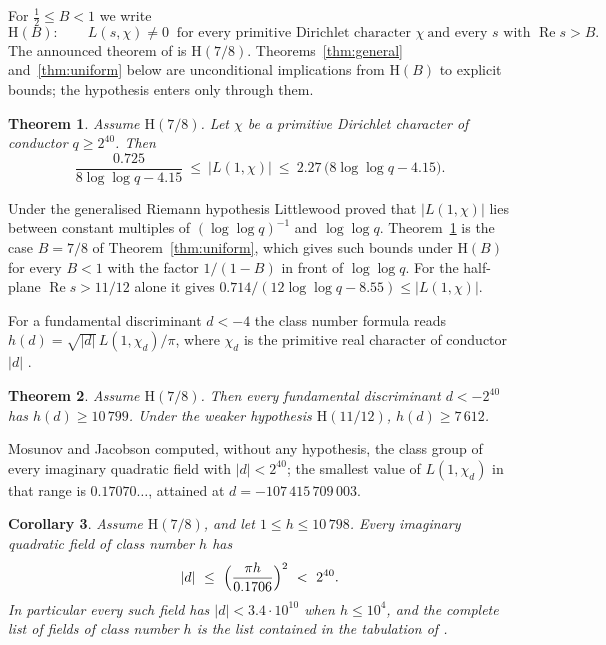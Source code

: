 \documentclass[11pt]{amsart}
\newtheorem{theorem}{Theorem}[section]
\newtheorem{corollary}[theorem]{Corollary}
\theoremstyle{definition}
\theoremstyle{remark}
\renewcommand{\Re}{\operatorname{Re}}
\begin{document}
For $\tfrac12\le B<1$ we write
\[
\mathrm{H}(B):\qquad L(s,\chi)\neq0 \ \text{ for every primitive Dirichlet character }\chi\ \text{and every }s \text{ with } \Re s>B .
\]
The announced theorem of \cite{OAI-QRH} is $\mathrm{H}(7/8)$. Theorems~\ref{thm:general} and~\ref{thm:uniform} below are unconditional implications from $\mathrm{H}(B)$ to explicit bounds; the hypothesis enters only through them.

\begin{theorem}\label{thm:main}
Assume $\mathrm{H}(7/8)$. Let $\chi$ be a primitive Dirichlet character of conductor $q\ge 2^{40}$. Then
\[
\frac{0.725}{8\log\log q-4.15}\ \le\ |L(1,\chi)|\ \le\ 2.27\,\bigl(8\log\log q-4.15\bigr).
\]
\end{theorem}

Under the generalised Riemann hypothesis Littlewood \cite{Lit28} proved that $|L(1,\chi)|$ lies between constant multiples of $(\log\log q)^{-1}$ and $\log\log q$. Theorem~\ref{thm:main} is the case $B=7/8$ of Theorem~\ref{thm:uniform}, which gives such bounds under $\mathrm{H}(B)$ for every $B<1$ with the factor $1/(1-B)$ in front of $\log\log q$. For the half-plane $\Re s>11/12$ alone it gives $0.714/(12\log\log q-8.55)\le|L(1,\chi)|$.

For a fundamental discriminant $d<-4$ the class number formula reads $h(d)=\sqrt{|d|}\,L(1,\chi_d)/\pi$, where $\chi_d$ is the primitive real character of conductor $|d|$ \cite[Chapter 6]{Dav80}.

\begin{theorem}\label{thm:h}
Assume $\mathrm{H}(7/8)$. Then every fundamental discriminant $d<-2^{40}$ has $h(d)\ge 10\,799$. Under the weaker hypothesis $\mathrm{H}(11/12)$, $h(d)\ge 7\,612$.
\end{theorem}

Mosunov and Jacobson \cite{MJ16} computed, without any hypothesis, the class group of every imaginary quadratic field with $|d|<2^{40}$; the smallest value of $L(1,\chi_d)$ in that range is $0.17070\ldots$, attained at $d=-107\,415\,709\,003$.

\begin{corollary}\label{cor:cnp}
Assume $\mathrm{H}(7/8)$, and let $1\le h\le 10\,798$. Every imaginary quadratic field of class number $h$ has
\[
|d|\ \le\ \Bigl(\frac{\pi h}{0.1706}\Bigr)^{2}\ <\ 2^{40}.
\]
In particular every such field has $|d|<3.4\cdot10^{10}$ when $h\le 10^4$, and the complete list of fields of class number $h$ is the list contained in the tabulation of \cite{MJ16}.
\end{corollary}
\end{document}
